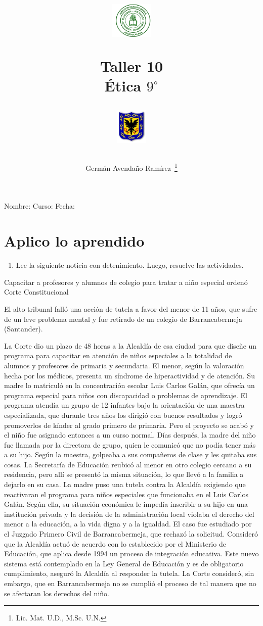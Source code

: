 \documentclass[10pt,twoside]{article}
\author{Germ\'an Avenda\~no Ram\'irez~\thanks{Lic. Mat. U.D., M.Sc. U.N.}}
\title{\begin{minipage}{.2\textwidth}
\includegraphics[height=1.75cm]{Images/logo-colegio.png}\end{minipage}
\begin{minipage}{.55\textwidth}
\begin{center}
Taller 10\\
Ética $9^{\circ}$
\end{center}
\end{minipage}\hfill
\begin{minipage}{.2\textwidth}
\includegraphics[height=1.75cm]{Images/logo-sed.png} 
\end{minipage}}
\date{}
\begin{document}
\maketitle
Nombre: \hrulefill Curso: \underline{\hspace*{44pt}} Fecha: \underline{\hspace*{2.5cm}}
\section*{Aplico lo aprendido}
\begin{enumerate}
\item Lee la siguiente noticia con detenimiento. Luego, resuelve las
actividades.
\end{enumerate}
Capacitar a profesores y alumnos de colegio para tratar a niño
especial ordenó Corte Constitucional

El alto tribunal falló una acción de tutela a favor del menor de
11 años, que sufre de un leve problema mental y fue retirado de
un colegio de Barrancabermeja (Santander).

La Corte dio un plazo de 48 horas a la Alcaldía de esa ciudad
para que diseñe un programa para capacitar en atención de niños
especiales a la totalidad de alumnos y profesores de primaria y
secundaria. El menor, según la valoración hecha por los médicos,
presenta un síndrome de hiperactividad y de atención. Su madre lo
matriculó en la concentración escolar Luis Carlos Galán, que ofrecía
un programa especial para niños con discapacidad o problemas de
aprendizaje. El programa atendía un grupo de 12 infantes bajo la
orientación de una maestra especializada, que durante tres años
los dirigió con buenos resultados y logró promoverlos de kínder
al grado primero de primaria. Pero el proyecto se acabó y el niño
fue asignado entonces a un curso normal. Días después, la madre
del niño fue llamada por la directora de grupo, quien le comunicó
que no podía tener más a su hijo. Según la maestra, golpeaba a
sus compañeros de clase y les quitaba sus cosas. La Secretaría de
Educación reubicó al menor en otro colegio cercano a su residencia,
pero allí se presentó la misma situación, lo que llevó a la familia
a dejarlo en su casa. La madre puso una tutela contra la Alcaldía
exigiendo que reactivaran el programa para niños especiales
que funcionaba en el Luis Carlos Galán. Según ella, su situación
económica le impedía inscribir a su hijo en una institución privada
y la decisión de la administración local violaba el derecho del
menor a la educación, a la vida digna y a la igualdad. El caso fue
estudiado por el Juzgado Primero Civil de Barrancabermeja, que
rechazó la solicitud. Consideró que la Alcaldía actuó de acuerdo
con lo establecido por el Ministerio de Educación, que aplica desde
1994 un proceso de integración educativa. Este nuevo sistema está
contemplado en la Ley General de Educación y es de obligatorio
cumplimiento, aseguró la Alcaldía al responder la tutela. La Corte
consideró, sin embargo, que en Barrancabermeja no se cumplió el
proceso de tal manera que no se afectaran los derechos del niño.
\end{document}
